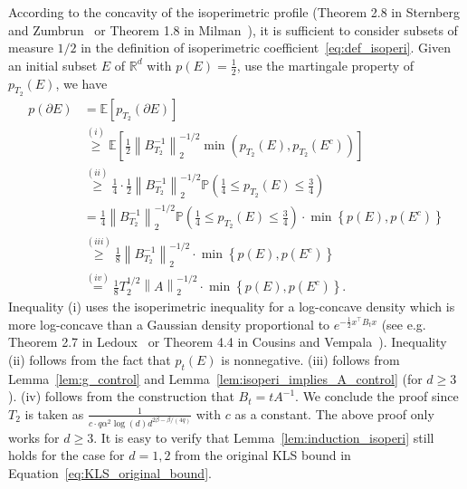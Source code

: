 \documentclass[11pt,twoside]{article}
\newcommand{\co}{A}
\theoremstyle{named}
\theoremstyle{plain}
\newcommand{\vecnorm}[2]{\left\| #1\right\|_{#2}}
\newcommand{\Exs}{\ensuremath{{\mathbb{E}}}}
\newcommand{\Prob}{\ensuremath{{\mathbb{P}}}}
\newcommand{\usedim}{\ensuremath{d}}
\newcommand{\dims}{\usedim}
\newcommand{\real}{\ensuremath{\mathbb{R}}}
\newcommand{\brackets}[1]{\left[ #1 \right]}
\newcommand{\parenth}[1]{\left( #1 \right)}
\newcommand{\braces}[1]{\left\{ #1 \right \}}
\newcommand{\tp}{^\top}
\begin{document}
According to the concavity of the isoperimetric profile (Theorem 2.8 in Sternberg and Zumbrun~\cite{sternberg1999connectivity} or Theorem 1.8 in Milman~\cite{milman2009role}), it is sufficient to consider subsets of measure $1/2$ in the definition of isoperimetric coefficient~\eqref{eq:def_isoperi}. Given an initial subset $E$ of $\real^\dims$ with $p(E) = \frac{1}{2}$, use the martingale property of $p_{T_2}(E)$, we have
\begin{align*}
  p(\partial E) &= \Exs \brackets{p_{T_2}(\partial E)} \\
  & \stackrel{(i)}{\geq} \Exs\brackets{\frac{1}{2}\vecnorm{B_{T_2}^{-1}}{2}^{-1/2} \min \parenth{p_{T_2}(E), p_{T_2}(E^c)}} \\
  & \stackrel{(ii)}{\geq} \frac{1}{4}\cdot \frac{1}{2}\vecnorm{B_{T_2}^{-1}}{2}^{-1/2} \Prob( \frac{1}{4}\leq p_{T_2}(E) \leq \frac{3}{4})\\
  & = \frac{1}{4}\vecnorm{B_{T_2}^{-1}}{2}^{-1/2} \Prob( \frac{1}{4}\leq p_{T_2}(E) \leq \frac{3}{4}) \cdot \min\braces{p(E), p(E^c)} \\
  &\stackrel{(iii)}{\geq} \frac{1}{8}\vecnorm{B_{T_2}^{-1}}{2}^{-1/2} \cdot \min\braces{p(E), p(E^c)} \\
  &\stackrel{(iv)}{=} \frac{1}{8}T_2^{1/2}\vecnorm{\co}{2}^{-1/2} \cdot \min\braces{p(E), p(E^c)}.
\end{align*}
Inequality (i) uses the isoperimetric inequality for a log-concave density which is more log-concave than a Gaussian density proportional to $e^{-\frac{1}{2}x\tp B_t x}$ (see e.g. Theorem 2.7 in Ledoux~\cite{ledoux2001concentration} or Theorem 4.4 in Cousins and Vempala~\cite{cousins2014cubic}). Inequality (ii) follows from the fact that $p_t(E)$ is nonnegative. (iii) follows from Lemma~\ref{lem:g_control} and Lemma~\ref{lem:isoperi_implies_A_control} (for $\dims \geq 3$). (iv) follows from the construction that $B_t = t \co^{-1}$.
We conclude the proof since $T_2$ is taken as $\frac{1}{ c \cdot q \alpha^2\log(\dims) \dims^{2\beta - \beta/(4q)}}$ with $c$ as a constant.
The above proof only works for $\dims \geq 3$. It is easy to verify that Lemma~\ref{lem:induction_isoperi} still holds for the case for $\dims = 1, 2$ from the original KLS bound in Equation~\eqref{eq:KLS_original_bound}.

\end{document}
